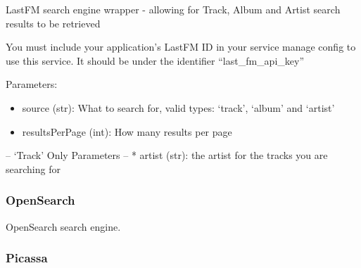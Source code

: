 \documentclass[letterpaper,10pt,english]{sphinxmanual}
\begin{document}
\begin{fulllineitems}
\label{api3.0:puppy.search.engine.LastFm}
LastFM search engine wrapper - allowing for Track, Album and Artist search results to be retrieved

You must include your application's LastFM ID in your service manage config to use this service. It should be under the identifier ``last\_fm\_api\_key''

Parameters:
\begin{itemize}
\item {} 
source (str): What to search for, valid types: `track', `album' and `artist'

\item {} 
resultsPerPage (int): How many results per page

\end{itemize}

-- `Track' Only Parameters --
* artist (str): the artist for the tracks you are searching for

\end{fulllineitems}



\subsubsection{OpenSearch}
\label{api3.0:opensearch}

\begin{fulllineitems}
\label{api3.0:puppy.search.engine.OpenSearch}
OpenSearch search engine.

\end{fulllineitems}



\subsubsection{Picassa}
\label{api3.0:picassa}
\end{document}
